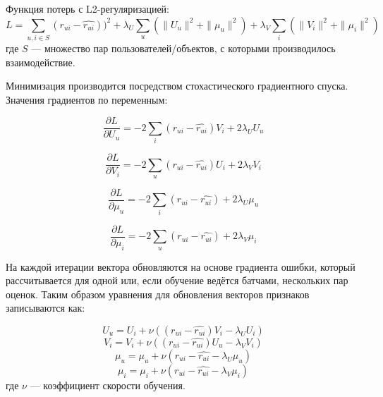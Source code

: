 Функция потерь с L2-регуляризацией:
\begin{equation}\label{eq:9}
        L = \sum_{u, i\in S}{(r_{ui} - \hat{r_{ui}})) ^ 2} + \lambda_{U}\sum_{u}{(\|U_{u}\| ^ 2 + \|\mu_{u}\| ^ 2)} + \lambda_{V}\sum_{i}{(\|V_{i}\| ^ 2 + \|\mu_{i}\| ^ 2)}
\end{equation}
где $S$ --- множество пар пользователей/объектов, с которыми производилось взаимодействие.

Минимизация производится посредством стохастического градиентного спуска.
Значения градиентов по переменным:

\begin{equation}\label{eq:10}
        \frac{\partial L}{\partial U_{u}} = -2\sum_{i}{(r_{ui} - \hat{r_{ui}})V_{i} + 2 \lambda_{U}U_{u}}
\end{equation}

\begin{equation}\label{eq:11}
        \frac{\partial L}{\partial V_{i}} = -2\sum_{u}{(r_{ui} - \hat{r_{ui}})U_{i} + 2 \lambda_{V}V_{i}}
\end{equation}

\begin{equation}\label{eq:12}
        \frac{\partial L}{\partial \mu_{u}} = -2\sum_{i}{(r_{ui} - \hat{r_{ui}}) + 2 \lambda_{U}\mu_{u}}
\end{equation}

\begin{equation}\label{eq:13}
        \frac{\partial L}{\partial \mu_{i}} = -2\sum_{u}{(r_{ui} - \hat{r_{ui}}) + 2 \lambda_{V}\mu_{i}}
\end{equation}

На каждой итерации вектора обновляются на основе градиента ошибки, который рассчитывается для одной или, если обучение ведётся батчами, нескольких пар оценок.
Таким образом уравнения для обновления векторов признаков записываются как:

\begin{equation}\label{eq:14}
        U_{u} = U_{i} + \nu ((r_{ui} - \hat{r_{ui}})V_{i} - \lambda_{U}U_{i})
\end{equation}
\begin{equation}\label{eq:15}
        V_{i} = V_{i} + \nu ((r_{ui} - \hat{r_{ui}})U_{u} - \lambda_{V}V_{i})
\end{equation}
\begin{equation}\label{eq:16}
        \mu_{u} = \mu_{u} + \nu (r_{ui} - \hat{r_{ui}} - \lambda_{U}\mu_{u})
\end{equation}
\begin{equation}\label{eq:17}
        \mu_{i} = \mu_{i} + \nu (r_{ui} - \hat{r_{ui}} - \lambda_{V}\mu_{i})
\end{equation}
где $\nu$ --- коэффициент скорости обучения.

